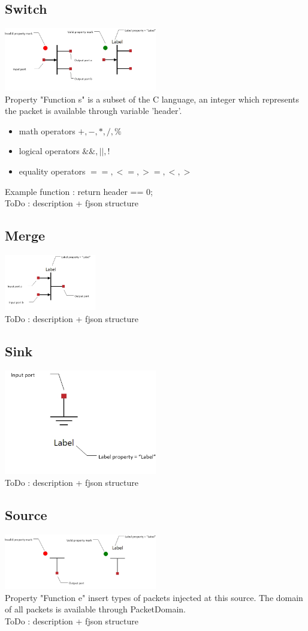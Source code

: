\documentclass[a4paper,11pt,final]{article}
\begin{document}
\subsection{Switch}
\includegraphics[width=0.5\textwidth]{switch}
\\Property "Function s" is a subset of the C language, an integer which represents the packet is available through variable 'header'. 
\begin{itemize}
\item math operators $+,-,*,/,\%$
\item logical operators $\&\&,||,!$
\item equality operators $==,<=,>=,<,>$
\end{itemize} 
Example function : return header == 0;
\\ToDo : description + fjson structure  
\subsection{Merge}
\includegraphics[width=0.3\textwidth]{merge}
\\ToDo : description + fjson structure
\subsection{Sink}
\includegraphics[width=0.5\textwidth]{sink}
\\ToDo : description + fjson structure
\subsection{Source}
\includegraphics[width=0.5\textwidth]{source}
\\Property "Function e" insert types of packets injected at this source. The domain of all packets is available through PacketDomain. 
\\ToDo : description + fjson structure
\end{document}
